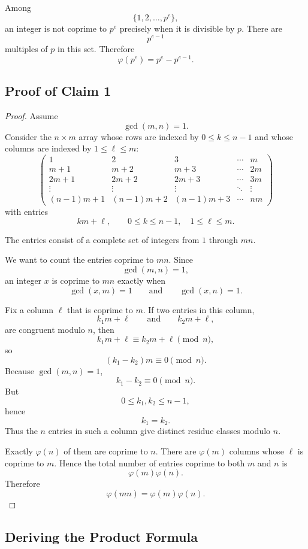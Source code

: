 \documentclass[11pt]{article}
\theoremstyle{remark}
\DeclareMathOperator{\gcdop}{gcd}
\newcommand{\phiE}{\varphi}
\begin{document}
Among
\[
    \{1,2,\ldots,p^e\},
\]
an integer is not coprime to $p^e$ precisely when it is divisible by $p$.
There are
\[
    p^{e-1}
\]
multiples of $p$ in this set. Therefore
\[
    \phiE(p^e)
    =
    p^e-p^{e-1}.
\]

\subsection{Proof of Claim 1}

\begin{proof}
Assume
\[
    \gcdop(m,n)=1.
\]
Consider the $n\times m$ array whose rows are indexed by $0\le k\le n-1$
and whose columns are indexed by $1\le\ell\le m$:
\[
\begin{pmatrix}
1 & 2 & 3 & \cdots & m\\
m+1 & m+2 & m+3 & \cdots & 2m\\
2m+1 & 2m+2 & 2m+3 & \cdots & 3m\\
\vdots & \vdots & \vdots & \ddots & \vdots\\
(n-1)m+1 & (n-1)m+2 & (n-1)m+3 & \cdots & nm
\end{pmatrix}
\]
with entries
\[
    km+\ell,
    \qquad
    0\le k\le n-1,\quad 1\le\ell\le m.
\]

The entries consist of a complete set of integers from $1$ through $mn$.

We want to count the entries coprime to $mn$. Since
\[
    \gcdop(m,n)=1,
\]
an integer $x$ is coprime to $mn$ exactly when
\[
    \gcdop(x,m)=1
    \qquad\text{and}\qquad
    \gcdop(x,n)=1.
\]

Fix a column $\ell$ that is coprime to $m$. If two entries in this column,
\[
    k_1m+\ell
    \qquad\text{and}\qquad
    k_2m+\ell,
\]
are congruent modulo $n$, then
\[
    k_1m+\ell\equiv k_2m+\ell\pmod n,
\]
so
\[
    (k_1-k_2)m\equiv0\pmod n.
\]
Because $\gcdop(m,n)=1$,
\[
    k_1-k_2\equiv0\pmod n.
\]
But
\[
    0\le k_1,k_2\le n-1,
\]
hence
\[
    k_1=k_2.
\]
Thus the $n$ entries in such a column give distinct residue classes modulo $n$.

Exactly $\phiE(n)$ of them are coprime to $n$. There are
$\phiE(m)$ columns whose $\ell$ is coprime to $m$. Hence the total number
of entries coprime to both $m$ and $n$ is
\[
    \phiE(m)\phiE(n).
\]
Therefore
\[
    \boxed{\phiE(mn)=\phiE(m)\phiE(n)}.
\]
\end{proof}

\subsection{Deriving the Product Formula}
\end{document}
